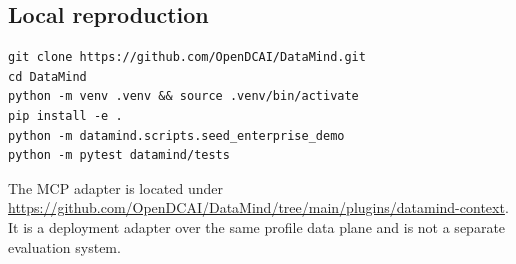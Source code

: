 \subsection{Local reproduction}
\label{app:install}

\begin{verbatim}
git clone https://github.com/OpenDCAI/DataMind.git
cd DataMind
python -m venv .venv && source .venv/bin/activate
pip install -e .
python -m datamind.scripts.seed_enterprise_demo
python -m pytest datamind/tests
\end{verbatim}

The MCP adapter is located under
\url{https://github.com/OpenDCAI/DataMind/tree/main/plugins/datamind-context}.
It is a deployment adapter over the same profile data plane and is not a
separate evaluation system.
